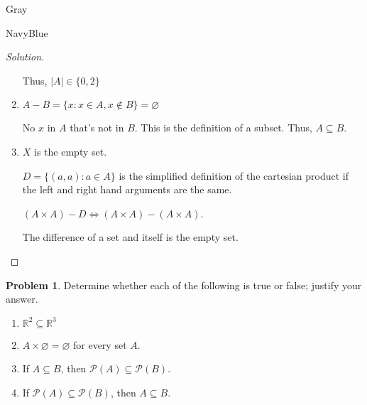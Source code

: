 \documentclass[12pt]{amsart}
\newcounter{problem_number}[section]
\theoremstyle{named}
\newenvironment{soln}
{\begin{color}{Gray}\begin{framed}\begin{color}{NavyBlue}\begin{proof}[Solution]
\doublespacing}
{\end{proof}\end{color}\end{framed}\end{color}}
\theoremstyle{definition}
\newtheorem{problem}{Problem}
\newcommand{\R}{\mathbb R}
\begin{document}
\begin{soln}
\begin{enumerate}
        \noindent Thus, $|A| \in \{0,2\}$

        \phantom{ }

        \item $ A - B = \{x : x \in A, x \notin B\} = \varnothing$
        
        \noindent No $x$ in $A$ that's not in $B$. This is the definition of a
        subset. Thus, $A \subseteq B$. 

        \item $X$ is the empty set. 
        
        \noindent $D = \{(a,a) : a \in A\}$ is the simplified definition of the
        cartesian product if the left and right hand arguments are the same. 
        
        \noindent$(A \times A) - D \iff (A \times A) - (A \times A)$. 
        
        \noindent The difference of a set and itself is the empty set. 
    \end{enumerate}
\end{soln}
\begin{problem}
	Determine whether each of the following is true or false; justify your answer.
	\begin{enumerate}
		\item $\R^2\subseteq\R^3$
		\item $A\times\varnothing = \varnothing$ for every set $A$.
		\item If $A\subseteq B$, then $\mathscr P(A)\subseteq\mathscr P(B)$.	
		\item If $\mathscr P(A)\subseteq\mathscr P(B)$, then $A\subseteq B$. 
	\end{enumerate}
	
\end{problem}
\end{document}
